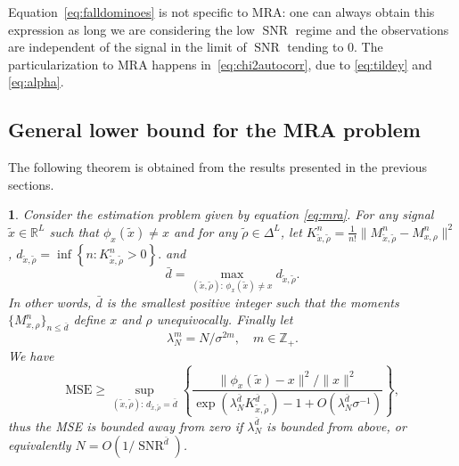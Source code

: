 \documentclass{IEEEtran}
\numberwithin{equation}{section}
\numberwithin{figure}{section}
\theoremstyle{plain}
\newtheorem{thm}{\protect\theoremname}[section]
\theoremstyle{definition}
\theoremstyle{remark}
\theoremstyle{plain}
\theoremstyle{remark}
\theoremstyle{plain}
\theoremstyle{plain}
\theoremstyle{remark}
\providecommand{\theoremname}{Theorem}
\newcommand{\reals}{\mathbb{R}}
\newcommand{\SNR}{\operatorname{SNR}}
\newcommand{\Z}{{\mathbb{Z}}}
\newcommand{\MSE}{\mathrm{MSE}}
\newcommand{\OO}{{O}}
\begin{document}
Equation~\eqref{eq:falldominoes} is not specific to MRA: one can always obtain this expression as long we are considering the low $\SNR$ regime and the observations are independent of the signal in the limit of $\SNR$ tending to 0. The particularization to MRA happens in~\eqref{eq:chi2autocorr}, due to \eqref{eq:tildey} and \eqref{eq:alpha}. 

\subsection{General lower bound for the MRA problem}\label{sec:lowerboundMRA}

The following theorem is obtained from the results presented in the previous sections.
%
\begin{thm}\label{thm:metalowerbound}
	Consider the estimation problem given by equation \eqref{eq:mra}. For any signal $\tilde x\in \reals^L$ such that $\phi_x(\tilde x)\neq x$ and for any $\tilde \rho\in \Delta^L$, let $K^n_{\tilde x,\tilde \rho}=\frac1{n!}\|M^n_{\tilde x,\tilde \rho}- M^n_{x,\rho}\|^2$, 
	\linebreak $d_{\tilde x,\tilde \rho}=\inf\left\{n:K^n_{\tilde x,\tilde \rho}>0\right\}.$ and
	$$\bar d=\max_{(\tilde x,\tilde \rho):\, \phi_x(\tilde x)\neq x} d_{\tilde x,\tilde \rho}.$$ In other words, $\bar d$ is the smallest positive integer such that the moments $\{M^n_{x,\rho}\}_{n\le\bar d}$ define $x$ and $\rho$ unequivocally.
	Finally let
	$$\lambda^{m}_N=N/\sigma^{2m},\quad m\in \Z_+.$$
	We have
	\begin{equation}\label{eq:momentssanov}
	\MSE\ge \sup_{(\tilde x,\tilde \rho):\, d_{\tilde x,\tilde \rho}=\bar d}\left\{\frac{\|\phi_{x}(\tilde x)-x\|^2/\|x\|^2}
	{\exp\left(\lambda^{\bar d}_N K^{\bar d}_{\tilde x,\tilde \rho}\right)-1+\OO\left(\lambda^{\bar d}_N \sigma^{-1}\right)}\right\},
	\end{equation}
	thus the MSE is bounded away from zero if $\lambda^{\bar d}_N$ is bounded from above, or equivalently $N=\OO(1/\SNR^{\bar d})$.
\end{thm}
\end{document}
